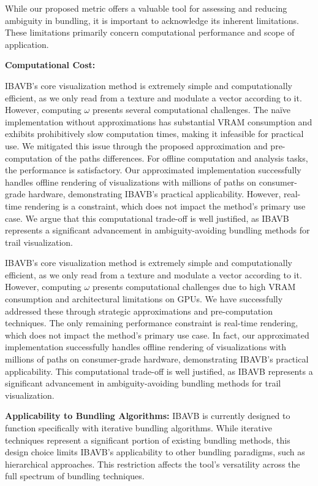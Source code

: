 While our proposed metric offers a valuable tool for assessing and reducing ambiguity in bundling, it is important to acknowledge its inherent limitations. These limitations primarily concern computational performance and scope of application.

\textbf{Computational Cost:}

IBAVB's core visualization method is extremely simple and computationally efficient, as we only read from a texture and modulate a vector according to it. However, computing $\omega$ presents several computational challenges. The na\"ive implementation without approximations has substantial VRAM consumption and exhibits prohibitively slow computation times, making it infeasible for practical use. We mitigated this issue through the proposed approximation and pre-computation of the paths differences. For offline computation and analysis tasks, the performance is satisfactory. Our approximated implementation successfully handles offline rendering of visualizations with millions of paths on consumer-grade hardware, demonstrating IBAVB's practical applicability. However, real-time rendering is a constraint, which does not impact the method's primary use case. We argue that this computational trade-off is well justified, as IBAVB represents a significant advancement in ambiguity-avoiding bundling methods for trail visualization.

IBAVB's core visualization method is extremely simple and computationally efficient, as we only read from a texture and modulate a vector according to it. However, computing $\omega$ presents computational challenges due to high VRAM consumption and architectural limitations on GPUs. We have successfully addressed these through strategic approximations and pre-computation techniques. The only remaining performance constraint is real-time rendering, which does not impact the method's primary use case. In fact, our approximated implementation successfully handles offline rendering of visualizations with millions of paths on consumer-grade hardware, demonstrating IBAVB's practical applicability. This computational trade-off is well justified, as IBAVB represents a significant advancement in ambiguity-avoiding bundling methods for trail visualization.

\textbf{Applicability to Bundling Algorithms:} IBAVB is currently designed to function specifically with iterative bundling algorithms. While iterative techniques represent a significant portion of existing bundling methods, this design choice limits IBAVB's applicability to other bundling paradigms, such as hierarchical approaches. This restriction affects the tool's versatility across the full spectrum of bundling techniques.

